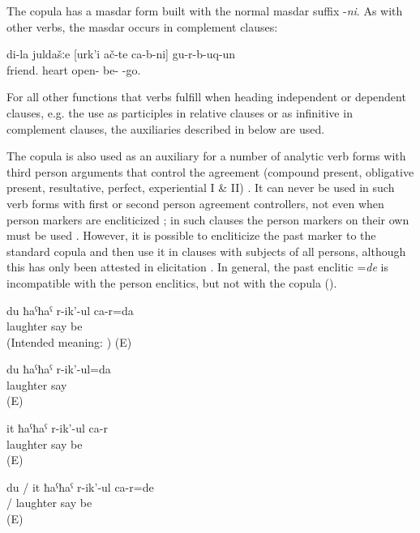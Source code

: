 The copula has a masdar form built with the normal masdar suffix -\textit{ni}. As with other verbs, the masdar occurs in complement clauses:

\begin{exe}
	\ex	\label{ex:My friends turned out to be open-hearted.}
	\gll	di-la		juldašːe		[urk'i	ač-te		ca-b-ni]			gu-r-b-uq-un\\
			friend.	heart	open- 	be-	-go.\\
	\glt	{}
\end{exe}



For all other functions that verbs fulfill when heading independent or dependent clauses, e.g. the use as participles in relative clauses or as infinitive in complement clauses, the auxiliaries described in  below are used. 

The copula is also used as an auxiliary for a number of analytic verb forms with third person arguments that control the agreement (compound present, obligative present, resultative, perfect, experiential I \& II) . It can never be used in such verb forms with first or second person agreement controllers, not even when person markers are encliticized ; in such clauses the person markers on their own must be used . However, it is possible to encliticize the past marker  to the standard copula and then use it in clauses with subjects of all persons, although this has only been attested in elicitation . In general, the past enclitic =\textit{de} is incompatible with the person enclitics, but not with the copula ().
%
\begin{exe}
	\ex	\label{ex:ungrammaticalIamlaughing}
	\gll	*du	ħaˁħaˁ	r-ik'-ul	ca-r=da\\
		\hphantom{*}	laughter say	be\\
	\glt	(Intended meaning: ) (E)

	\ex	\label{ex:I am laughing}
	\gll	du	ħaˁħaˁ	r-ik'-ul=da\\
			laughter say\\
	\glt	{} (E)

	\ex	\label{ex:She is laughing}
	\gll	it	ħaˁħaˁ	r-ik'-ul	ca-r\\
			laughter say	be\\
	\glt	{} (E)

	\ex	\label{ex:I was / She was laughing}
	\gll	du	/	it	ħaˁħaˁ	r-ik'-ul	ca-r=de\\
			/		laughter say	be\\
	\glt	{} (E)
\end{exe}

